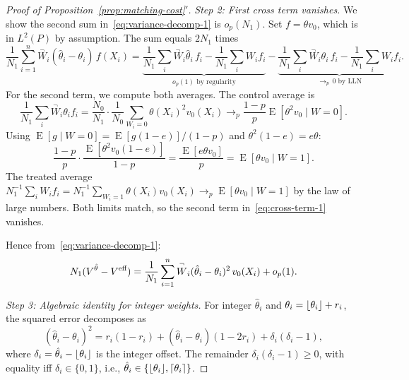 \documentclass{article}
\newcommand{\paragraph}[1]{\par\noindent\textit{#1}\enspace}
\theoremstyle{definition}
\DeclareMathOperator{\E}{E}
\DeclarePairedDelimiter\floor{\lfloor}{\rfloor}
\DeclarePairedDelimiter\ceil{\lceil}{\rceil}
\newcommand{\<}{\langle}
\renewcommand{\>}{\rangle}
\begin{document}
\begin{refsection}
\begin{proof}[Proof of Proposition~\ref{prop:matching-cost}$'$]
\paragraph{Step 2: First cross term vanishes.}
We show the second sum in~\eqref{eq:variance-decomp-1} is $o_p(N_1)$. Set $f = \theta v_0$, which is in $L^2(P)$ by assumption. The sum equals $2N_1$ times
\begin{equation}
\label{eq:cross-term-1}
\frac{1}{N_1}\sum_{i=1}^n \overset{\neg}{W}_i(\hat\theta_i - \theta_i)\,f(X_i) = \underbrace{\frac{1}{N_1}\sum_i \overset{\neg}{W}_i\hat\theta_i\,f_i - \frac{1}{N_1}\sum_i W_i f_i}_{o_p(1) \text{ by regularity}} - \underbrace{\frac{1}{N_1}\sum_i \overset{\neg}{W}_i\theta_i\,f_i - \frac{1}{N_1}\sum_i W_i f_i}_{\to_p\, 0 \text{ by LLN}}.
\end{equation}
For the second term, we compute both averages. The control average is
\[
\frac{1}{N_1}\sum_i \overset{\neg}{W}_i\theta_i f_i = \frac{N_0}{N_1} \cdot \frac{1}{N_0}\sum_{W_i=0}\theta(X_i)^2 v_0(X_i) \to_p \frac{1{-}p}{p} \E[\theta^2 v_0 \mid W{=}0].
\]
Using $\E[g \mid W{=}0] = \E[g(1{-}e)]/(1{-}p)$ and $\theta^2(1{-}e) = e\theta$:
\[
\frac{1{-}p}{p}\cdot\frac{\E[\theta^2 v_0(1{-}e)]}{1{-}p} = \frac{\E[e\theta v_0]}{p} = \E[\theta v_0 \mid W{=}1].
\]
The treated average $N_1^{-1}\sum_i W_i f_i = N_1^{-1}\sum_{W_i=1} \theta(X_i) v_0(X_i) \to_p \E[\theta v_0 \mid W{=}1]$ by the law of large numbers. Both limits match, so the second term in~\eqref{eq:cross-term-1} vanishes.

Hence from~\eqref{eq:variance-decomp-1}:
\begin{equation}
\label{eq:variance-quadratic}
N_1(V^{\hat\theta} - V^{\textup{eff}}) = \frac{1}{N_1}\sum_{i=1}^n \overset{\neg}{W}_i(\hat\theta_i - \theta_i)^2\,v_0(X_i) + o_p(1).
\end{equation}

\paragraph{Step 3: Algebraic identity for integer weights.}
For integer $\hat\theta_i$ and $\theta_i = \floor{\theta_i} + r_i$, the squared error decomposes as
\begin{equation}
\label{eq:integer-identity}
(\hat\theta_i - \theta_i)^2 = r_i(1{-}r_i) + (\hat\theta_i - \theta_i)(1{-}2r_i) + \delta_i(\delta_i - 1),
\end{equation}
where $\delta_i = \hat\theta_i - \floor{\theta_i}$ is the integer offset. The remainder $\delta_i(\delta_i - 1) \ge 0$, with equality iff $\delta_i \in \{0,1\}$, i.e., $\hat\theta_i \in \{\floor{\theta_i}, \ceil{\theta_i}\}$.


\end{proof}
\end{refsection}
\end{document}
